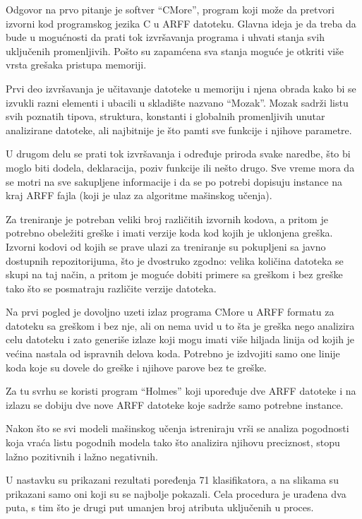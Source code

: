 \documentclass[a4paper]{article}
\begin{document}
Odgovor na prvo pitanje je softver ``CMore'', program koji može da pretvori izvorni kod programskog
jezika C u ARFF datoteku. Glavna ideja je da treba da bude u mogućnosti da prati tok izvršavanja programa
i uhvati stanja svih uključenih promenljivih. Pošto su zapamćena sva stanja moguće je otkriti više vrsta
grešaka pristupa memoriji.

Prvi deo izvršavanja je učitavanje datoteke u memoriju i njena obrada kako bi se izvukli
razni elementi i ubacili u skladište nazvano ``Mozak''.
Mozak sadrži listu svih poznatih tipova, struktura, konstanti i globalnih promenljivih unutar analizirane datoteke,
ali najbitnije je što pamti sve funkcije i njihove parametre.

U drugom delu se prati tok izvršavanja i određuje
priroda svake naredbe, što bi moglo biti dodela, deklaracija, poziv funkcije ili nešto drugo.
Sve vreme mora da se motri na sve sakupljene informacije i da se po potrebi dopisuju instance na kraj ARFF fajla
(koji je ulaz za algoritme mašinskog učenja).


Za treniranje je potreban veliki broj različitih izvornih kodova, a pritom je potrebno obeležiti greške i imati verzije koda kod kojih je uklonjena greška.
Izvorni kodovi od kojih se prave ulazi za treniranje su pokupljeni sa javno dostupnih repozitorijuma, što je dvostruko zgodno:
velika količina datoteka se skupi na taj način, a pritom je moguće dobiti primere sa greškom i bez greške tako što se posmatraju različite verzije datoteka.

Na prvi pogled je dovoljno uzeti izlaz programa CMore u ARFF formatu za datoteku sa greškom i bez nje, ali on nema uvid u to šta je greška nego analizira celu datoteku i zato
generiše izlaze koji mogu imati više hiljada linija od kojih je većina nastala od ispravnih delova koda.
Potrebno je izdvojiti samo one linije koda koje su dovele do greške i njihove parove bez te greške.

Za tu svrhu se koristi program ``Holmes'' koji upoređuje dve ARFF datoteke i na izlazu se dobiju dve nove ARFF datoteke koje sadrže samo potrebne  instance.

Nakon što se svi modeli mašinskog učenja istreniraju vrši se analiza pogodnosti
koja vraća listu pogodnih modela tako što analizira njihovu preciznost, stopu lažno pozitivnih i lažno negativnih.

U nastavku su prikazani rezultati poređenja 71 klasifikatora, a na slikama su prikazani samo oni koji su se najbolje pokazali. Cela procedura je urađena dva puta, s tim što je drugi put umanjen broj atributa uključenih u proces.
\end{document}
